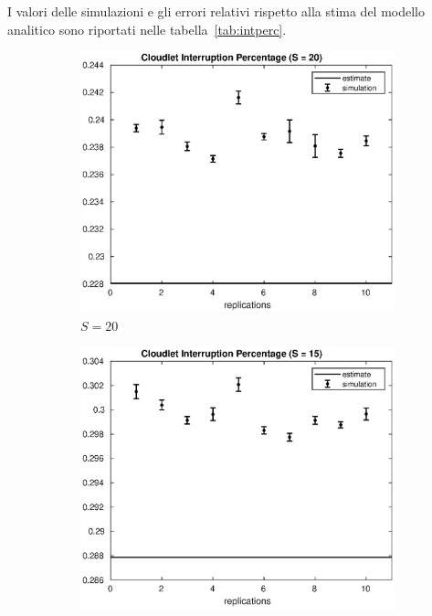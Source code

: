 I valori delle simulazioni e gli errori relativi rispetto alla stima del modello
analitico sono riportati nelle
tabella~\ref{tab:intperc}.
%
\begin{figure}[!h]
\centering
%
\begin{subfigure}[t]{0.49\textwidth}
\includegraphics[width=\textwidth]{figures/simul/20_500K_intperc}
\caption{$S = 20$}
\label{20_intperc}
\end{subfigure}
%
\begin{subfigure}[t]{0.49\textwidth}
\includegraphics[width=\textwidth]{figures/simul/15_500K_intperc}

\end{subfigure}
\end{figure}
